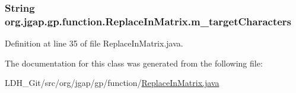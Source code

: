 \hypertarget{classorg_1_1jgap_1_1gp_1_1function_1_1_replace_in_matrix_a65fb8407fa93a6f77cf5f7097a4bf0fe}{
\subsubsection[{m\-\_\-target\-Characters}]{\setlength{\rightskip}{0pt plus 5cm}String org.\-jgap.\-gp.\-function.\-Replace\-In\-Matrix.\-m\-\_\-target\-Characters\hspace{0.3cm}{\ttfamily [private]}}}\label{classorg_1_1jgap_1_1gp_1_1function_1_1_replace_in_matrix_a65fb8407fa93a6f77cf5f7097a4bf0fe}


Definition at line 35 of file Replace\-In\-Matrix.\-java.



The documentation for this class was generated from the following file\-:\begin{DoxyCompactItemize}
\item 
L\-D\-H\-\_\-\-Git/src/org/jgap/gp/function/\hyperlink{_replace_in_matrix_8java}{Replace\-In\-Matrix.\-java}\end{DoxyCompactItemize}
